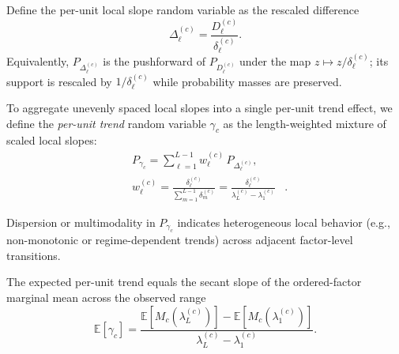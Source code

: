 Define the per-unit local slope random variable as the rescaled difference
\begin{equation}
\label{eq:scaled-local-contrast}
\Delta^{(c)}_\ell
=
\frac{D^{(c)}_\ell}{\delta^{(c)}_\ell}.
\end{equation}
Equivalently, $P_{\Delta^{(c)}_\ell}$ is the pushforward of $P_{D^{(c)}_\ell}$
under the map $z\mapsto z/\delta^{(c)}_\ell$; its support is rescaled by
$1/\delta^{(c)}_\ell$ while probability masses are preserved.

To aggregate unevenly spaced local slopes into a single per-unit trend effect,
we define the \emph{per-unit trend} random variable $\gamma_c$ as the
length-weighted mixture of scaled local slopes:
\begin{align}
\label{eq:trend-mixture}
&P_{\gamma_c}
=
\sum_{\ell=1}^{L-1}
w^{(c)}_\ell
\, P_{\Delta^{(c)}_\ell}, \\
&w^{(c)}_\ell
=
\frac{\delta^{(c)}_\ell}{\sum_{m=1}^{L-1}\delta^{(c)}_m}
=
\frac{\delta^{(c)}_\ell}{\lambda^{(c)}_L-\lambda^{(c)}_1}&.
\end{align}

Dispersion or multimodality in $P_{\gamma_c}$ indicates heterogeneous local
behavior (e.g., non-monotonic or regime-dependent trends) across adjacent
factor-level transitions.

\begin{proposition}
\label{prop:trend-expectation}
The expected per-unit trend equals the secant slope of the ordered-factor
marginal mean across the observed range
\begin{equation}
\label{eq:trend-expectation}
\mathbb{E}[\gamma_c]
=
\frac{
\mathbb{E}[M_c(\lambda^{(c)}_L)]
-
\mathbb{E}[M_c(\lambda^{(c)}_1)]
}{
\lambda^{(c)}_L-\lambda^{(c)}_1
}.
\end{equation}
\end{proposition}

